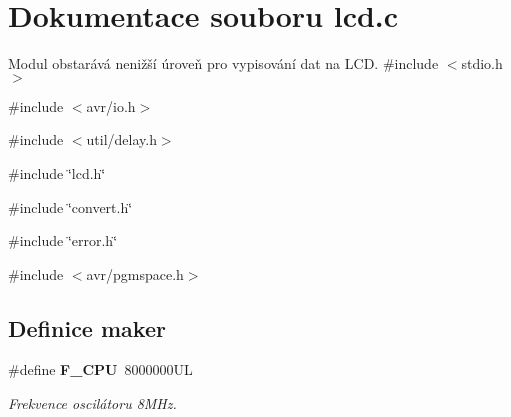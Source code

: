 \section{Dokumentace souboru lcd.c}
\label{lcd_8c}


Modul obstarává nenižší úroveň pro vypisování dat na LCD.  
{\ttfamily \#include $<$stdio.h$>$}\par
{\ttfamily \#include $<$avr/io.h$>$}\par
{\ttfamily \#include $<$util/delay.h$>$}\par
{\ttfamily \#include \char`\"{}lcd.h\char`\"{}}\par
{\ttfamily \#include \char`\"{}convert.h\char`\"{}}\par
{\ttfamily \#include \char`\"{}error.h\char`\"{}}\par
{\ttfamily \#include $<$avr/pgmspace.h$>$}\par
\subsection*{Definice maker}
\begin{DoxyCompactItemize}
\item 
\#define {\bf F\_\-CPU}~8000000UL
\begin{DoxyCompactList}\small\item\em Frekvence oscilátoru 8MHz. \item\end{DoxyCompactList}\end{DoxyCompactItemize}
